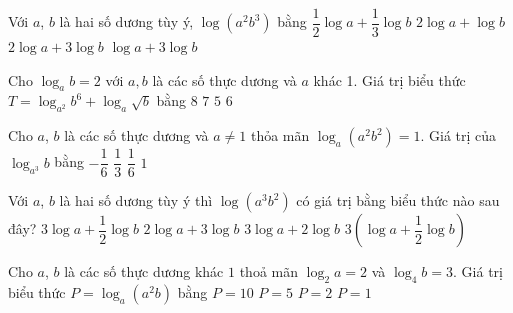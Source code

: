\begin{ex}%
	Với $a$, $b$ là hai số dương tùy ý, $\log\left(a^2b^3\right)$ bằng 
	\choice 
		{$\dfrac{1}{2}\log  a+\dfrac{1}{3}\log b$}
		{$  2\log a+\log b$}
		{\True $  2\log a+3\log b$}
		{$\log a+3\log  b$}
\end{ex}

\begin{ex}%
	Cho $\log_{a}b=2$ với $a, b$ là các số thực dương và $a$ khác 1. Giá trị biểu thức $T=\log_{a^{2}}b^{6}+\log_{a}\sqrt{b}$ bằng 
	\choice 
		 {$8$}
		{\True  $7$}
		 {$5$}
		 {$6$}
\end{ex}

\begin{ex}%
	Cho $a$, $b$ là các số thực dương và $a \neq 1$ thỏa mãn $\log _a\left(a^2 b^2\right)=1$. Giá  trị của $\log _{a^3} b$ bằng
	 \choice
		 {\True $-\dfrac{1}{6}$}
		 {$\dfrac{1}{3}$}
		{$\dfrac{1}{6}$} 
		{$1$} 
\end{ex}

\begin{ex}%
	Với  $a$, $b$ là hai số dương tùy ý thì $\log\left(a^{3}b^{2}\right)$ có giá trị bằng biểu thức nào sau đây?
	\choice 
		{$3\log  a+\dfrac{1}{2}\log b$}
		{$2\log a+3\log b$} 
		{\True $3\log a+2\log  b$}
		 {$3\left(\log a+\dfrac{1}{2}\log b\right)$}
\end{ex}

\begin{ex}%
	Cho $a$, $b$ là các số thực dương khác $1$ thoả mãn $\log_2a=2$  và $\log_4b=3$. Giá trị biểu thức $P=\log_a\left(a^2b\right)$ bằng
	\choice 
		 {$P=10$}
		 {\True $P=5$}
		{$P=2$} 
		 {$P=1$}
\end{ex}

